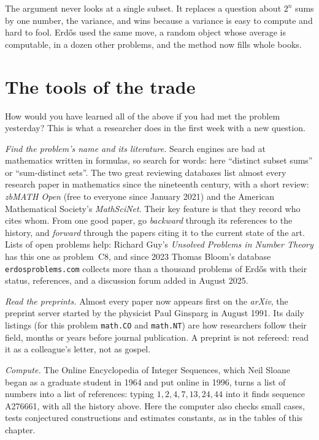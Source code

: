 \begin{beauty}
The argument never looks at a single subset. It replaces a question about $2^n$ sums by one number, the variance, and wins
because a variance is easy to compute and hard to fool. Erd\H os used the same move, a random object whose average is
computable, in a dozen other problems, and the method now fills whole books.
\end{beauty}

\section{The tools of the trade}

How would you have learned all of the above if you had met the problem yesterday? This is what a researcher does in the first week
with a new question.

\emph{Find the problem's name and its literature.} Search engines are bad at mathematics written in formulas, so search for words: here
``distinct subset sums'' or ``sum-distinct sets''. The two great reviewing databases list almost every research paper in mathematics since the
nineteenth century, with a short review: \emph{zbMATH Open} (free to everyone since January 2021) and the American Mathematical Society's
\emph{MathSciNet}. Their key feature is that they record who cites whom. From one good paper, go \emph{backward} through its references to the
history, and \emph{forward} through the papers citing it to the current state of the art. Lists of open problems help: Richard Guy's
\emph{Unsolved Problems in Number Theory} has this one as problem~C8, and since 2023 Thomas Bloom's database \texttt{erdosproblems.com} collects
more than a thousand problems of Erd\H os with their status, references, and a discussion forum added in August 2025.

\emph{Read the preprints.} Almost every paper now appears first on the \emph{arXiv}, the preprint server started by the physicist Paul Ginsparg in
August 1991. Its daily listings (for this problem \texttt{math.CO} and \texttt{math.NT}) are how researchers follow their field, months or years
before journal publication. A preprint is not refereed: read it as a colleague's letter, not as gospel.

\emph{Compute.} The Online Encyclopedia of Integer Sequences, which Neil Sloane began as a graduate student in 1964 and put online in 1996, turns
a list of numbers into a list of references: typing $1,2,4,7,13,24,44$ into it finds sequence A276661, with all the history above. Here the
computer also checks small cases, tests conjectured constructions and estimates constants, as in the tables of this chapter.


